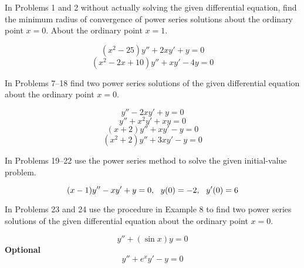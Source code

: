 \documentclass[12pt]{report}
\begin{document}
In Problems 1 and 2 without actually solving the given differential equation, find the minimum radius of convergence of power series solutions about the ordinary point $x=0$. About the ordinary point $x=1.$
\begin{enumerate}[label=\arabic*.]
	\problem \[ (x^{2} - 25)y'' + 2xy' + y = 0 \]							%
	\problem \[ (x^{2}-2x+10)y'' + xy' - 4y = 0 \]							%
\end{enumerate}

In Problems 7--18 find two power series solutions of the given differential equation about the ordinary point $x=0$.
\begin{enumerate}[label=\arabic*.,start=9]
    \problem \[ y'' - 2xy' + y = 0 \]										%
	\setcounter{enumi}{10}
	\problem \[ y'' + x^{2}y' + xy = 0 \]									%
	\setcounter{enumi}{13}
	\problem \[ (x+2)y'' + xy' - y = 0 \]									%
	\setcounter{enumi}{16}
	\problem \[ (x^{2}+2)y'' + 3xy' - y = 0 \]								%
\end{enumerate}

In Problems 19--22 use the power series method to solve the given initial-value problem.
\begin{enumerate}[label=\arabic*., start=19]
    \problem \[ (x-1)y'' - xy' + y = 0,\mbox{{ }{ }} y(0)=-2,\mbox{{ }{ }} y'(0)=6 \]	%
\end{enumerate}

In Problems 23 and 24 use the procedure in Example 8 to find two power series solutions of the given differential equation about the ordinary point $x=0$.
\begin{enumerate}[label=\arabic*.,start=23]
    \problem \[ y'' + (\sin x)y = 0 \]										%
    \problem \textbf{Optional} \[ y'' + e^{x}y' - y = 0 \]					%
\end{enumerate}
\end{document}
